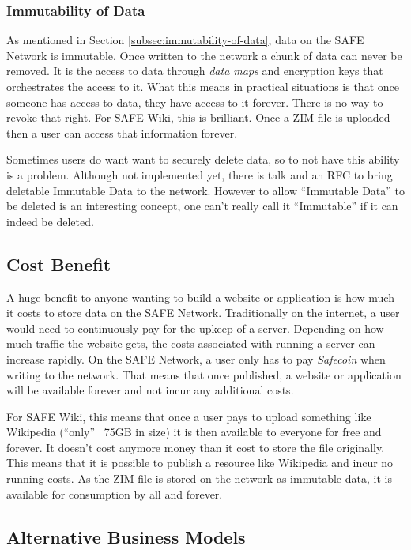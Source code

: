 \subsubsection{Immutability of Data}

As mentioned in Section \ref{subsec:immutability-of-data}, data on the SAFE Network is immutable. Once written to the network a chunk of data can never be removed. It is the access to data through \textit{data maps} and encryption keys that orchestrates the access to it. What this means in practical situations is that once someone has access to data, they have access to it forever. There is no way to revoke that right. For SAFE Wiki, this is brilliant. Once a ZIM file is uploaded then a user can access that information forever.

Sometimes users do want want to securely delete data, so to not have this ability is a problem. Although not implemented yet, there is talk and an RFC\cite{delete-data-rfc} to bring deletable Immutable Data to the network. However to allow ``Immutable Data'' to be deleted is an interesting concept, one can't really call it ``Immutable'' if it can indeed be deleted.

\subsection{Cost Benefit}
 
A huge benefit to anyone wanting to build a website or application is how much it costs to store data on the SAFE Network. Traditionally on the internet, a user would need to continuously pay for the upkeep of a server. Depending on how much traffic the website gets, the costs associated with running a server can increase rapidly. On the SAFE Network, a user only has to pay \textit{Safecoin} when writing to the network. That means that once published, a website or application will be available forever and not incur any additional costs.
 
For SAFE Wiki, this means that once a user pays to upload something like Wikipedia (``only'' ~75GB in size) it is then available to everyone for free and forever. It doesn't cost anymore money than it cost to store the file originally. This means that it is possible to publish a resource like Wikipedia and incur no running costs. As the ZIM file is stored on the network as immutable data, it is available for consumption by all and forever.
 
\subsection{Alternative Business Models}

